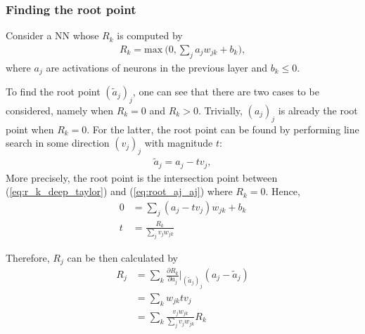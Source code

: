  
 

\subsubsection{Finding the root point} 
Consider a NN whose $R_k$ is computed by
\begin{align}\label{eq:r_k_deep_taylor}
R_k = \text{max}\ \bigg(0, \sum_{j} a_j w_{jk}  + b_k \bigg),
\end{align}
where $a_j$ are activations of neurons in the previous layer and  $b_k \le 0 $.

To find the root point $(\tilde{a}_j)_j$, one can see that  there are  two cases to be considered, namely when $R_k = 0$ and $R_k > 0$. Trivially, $(a_j)_j$ is already the root point when $R_k=0$. For the latter, the root point can be found by performing  line search in  some direction $(v_j)_j$ with magnitude $t$:
\begin{align}\label{eq:root_aj_aj}
\tilde{a}_j = a_j - t v_j,
\end{align}
More precisely, the root point is the intersection point between (\ref{eq:r_k_deep_taylor}) and (\ref{eq:root_aj_aj}) where $R_k=0$. Hence,
\begin{align*}
  0 &= 	\sum_{j} (a_j - t v_j) w_{jk}  + b_k\\
  t &= \frac{R_k}{\sum_{j} v_j w_{jk}}
\end{align*}

Therefore, $R_j$ can be then calculated by
\begin{align*}
R_j &= \sum_k	\frac{\partial  R_k }{ \partial a_j } \bigg|_{ (\tilde{a}_j)_j }  ( a_j - \tilde{a}_j ) \\
&=	\sum_k w_{jk} tv_j \\
&=	\sum_k \frac{ v_j w_{jk}   }{\sum_{j} v_j w_{jk}}  R_k
\end{align*}

